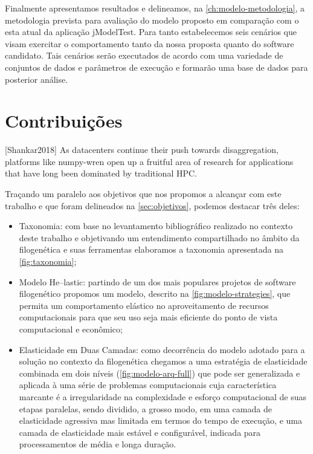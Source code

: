 \documentclass[english,brazilian]{UNISINOSmonografia} %
\begin{document}
Finalmente apresentamos resultados e delineamos, na \autoref{ch:modelo-metodologia}, a metodologia prevista para avaliação do modelo proposto em comparação com o esta atual da aplicação jModelTest.
Para tanto estabelecemos seis cenários que visam exercitar o comportamento tanto da nossa proposta quanto do software candidato.
Tais cenários serão executados de acordo com uma variedade de conjuntos de dados e parâmetros de execução e formarão uma base de dados para posterior análise.



\section{Contribuições}



[Shankar2018]
As datacenters continue
their push towards disaggregation, platforms like numpy-wren open up a fruitful area of research for applications
that have long been dominated by traditional HPC.



Traçando um paralelo aos objetivos que nos propomos a alcançar com este trabalho e que foram delineados na \autoref{sec:objetivos}, podemos destacar três deles:

\begin{itemize}
	\item Taxonomia: com base no levantamento bibliográfico realizado no contexto deste trabalho e objetivando um entendimento compartilhado no âmbito da filogenética e suas ferramentas elaboramos a taxonomia apresentada na \autoref{fig:taxonomia};
	
	\item Modelo \textsf{He}--lastic: partindo de um dos mais populares projetos de software filogenético propomos um modelo, descrito na \autoref{fig:modelo-strategies}, que permita um comportamento elástico no aproveitamento de recursos computacionais para que seu uso seja mais eficiente do ponto de vista computacional e econômico;
	
	\item Elasticidade em Duas Camadas: como decorrência do modelo adotado para a solução no contexto da filogenética chegamos a uma estratégia de elasticidade combinada em dois níveis (\autoref{fig:modelo-arq-full}) que pode ser generalizada e aplicada à uma série de problemas computacionais cuja característica marcante é a irregularidade na complexidade e esforço computacional de suas etapas paralelas, sendo dividido, a grosso modo, em uma camada de elasticidade agressiva mas limitada em termos do tempo de execução, e uma camada de elasticidade mais estável e configurável, indicada para processamentos de média e longa duração.
\end{itemize}
\end{document}
